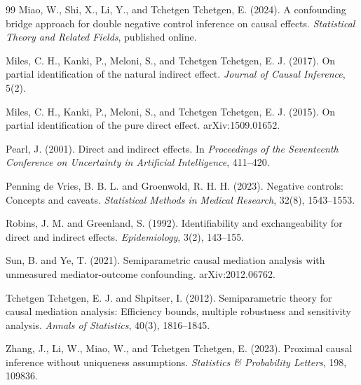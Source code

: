 \documentclass[11pt]{article}
\theoremstyle{definition}
\theoremstyle{plain}
\theoremstyle{remark}
\begin{document}
\begin{thebibliography}{99}
Miao, W., Shi, X., Li, Y., and Tchetgen Tchetgen, E. (2024).
A confounding bridge approach for double negative control inference on causal effects.
\emph{Statistical Theory and Related Fields}, published online.

Miles, C. H., Kanki, P., Meloni, S., and Tchetgen Tchetgen, E. J. (2017).
On partial identification of the natural indirect effect.
\emph{Journal of Causal Inference}, 5(2).

Miles, C. H., Kanki, P., Meloni, S., and Tchetgen Tchetgen, E. J. (2015).
On partial identification of the pure direct effect.
arXiv:1509.01652.

Pearl, J. (2001).
Direct and indirect effects.
In \emph{Proceedings of the Seventeenth Conference on Uncertainty in Artificial Intelligence}, 411--420.

Penning de Vries, B. B. L. and Groenwold, R. H. H. (2023).
Negative controls: Concepts and caveats.
\emph{Statistical Methods in Medical Research}, 32(8), 1543--1553.

Robins, J. M. and Greenland, S. (1992).
Identifiability and exchangeability for direct and indirect effects.
\emph{Epidemiology}, 3(2), 143--155.

Sun, B. and Ye, T. (2021).
Semiparametric causal mediation analysis with unmeasured mediator-outcome confounding.
arXiv:2012.06762.

Tchetgen Tchetgen, E. J. and Shpitser, I. (2012).
Semiparametric theory for causal mediation analysis: Efficiency bounds, multiple robustness and sensitivity analysis.
\emph{Annals of Statistics}, 40(3), 1816--1845.

Zhang, J., Li, W., Miao, W., and Tchetgen Tchetgen, E. (2023).
Proximal causal inference without uniqueness assumptions.
\emph{Statistics \& Probability Letters}, 198, 109836.
\end{thebibliography}
\end{document}
